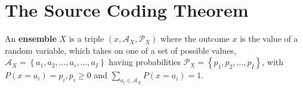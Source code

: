 



%
\maketitle

\renewcommand{\abstractname}{Acknowledgments}

\begin{abstract}
  \noindent Thank you to Yuval Widgerson from the Stanford Mathematics Department for useful discussions.
\end{abstract}

\tableofcontents

\section{The Source Coding Theorem}


\medskip


\begin{definition}
  An {\bf ensemble} $X$ is a triple $(x, \mathcal{A}_X, \mathcal{P}_X)$ where the outcome $x$ is the value of a random variable, which takes on one of a set of possible values, $\mathcal{A}_X = \left\{ a_1, a_2, \dots, a_i, \dots, a_I \right\}$ having probabilities $\mathcal{P}_X = \left\{ p_1, p_2, \dots, p_I \right\}$, with $P(x = a_i) = p_i, p_i \geq 0$ and $\sum_{a_i \in \mathcal{A}_X} P(x = a_i) = 1$.
\end{definition}

